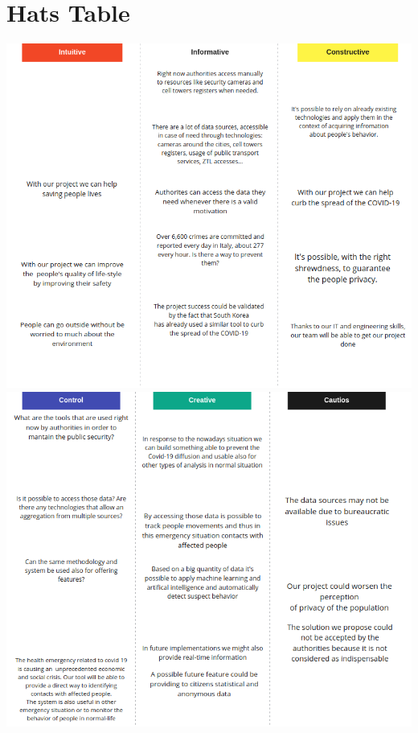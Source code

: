 \documentclass[../main.tex]{subfiles}
\begin{document}
    \section{Hats Table}\label{sec:hats-table}
    \includegraphics[scale = 0.5]{assets/hat1.png} \\
    \includegraphics[scale = 0.5]{assets/hat2.png}
\end{document}
